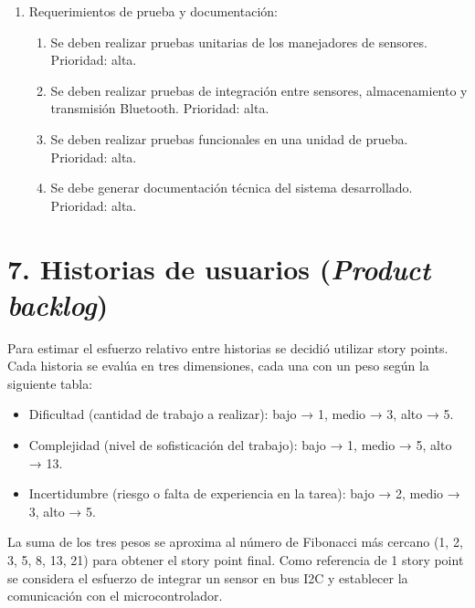 \documentclass[
11pt, %
]{charter}
\begin{document}
\begin{enumerate}
	\item Requerimientos de prueba y documentación:
		\begin{enumerate}
			\item Se deben realizar pruebas unitarias de los manejadores de sensores. Prioridad: alta.
			\item Se deben realizar pruebas de integración entre sensores, almacenamiento y transmisión Bluetooth. Prioridad: alta.
			\item Se deben realizar pruebas funcionales en una unidad de prueba. Prioridad: alta.
			\item Se debe generar documentación técnica del sistema desarrollado. Prioridad: alta.
		\end{enumerate}
\end{enumerate}

\section{7. Historias de usuarios (\textit{Product backlog})}
\label{sec:backlog}

Para estimar el esfuerzo relativo entre historias se decidió utilizar story points. Cada historia se evalúa en tres dimensiones, cada una con un peso según la siguiente tabla:

\begin{itemize}
  \item Dificultad (cantidad de trabajo a realizar): bajo → 1, medio → 3, alto → 5.
  \item Complejidad (nivel de sofisticación del trabajo): bajo → 1, medio → 5, alto → 13.
  \item Incertidumbre (riesgo o falta de experiencia en la tarea): bajo → 2, medio → 3, alto → 5.
\end{itemize}

La suma de los tres pesos se aproxima al número de Fibonacci más cercano (1, 2, 3, 5, 8, 13, 21) para obtener el story point final. Como referencia de 1 story point se considera el esfuerzo de integrar un sensor en bus I2C y establecer la comunicación con el microcontrolador.
\end{document}
